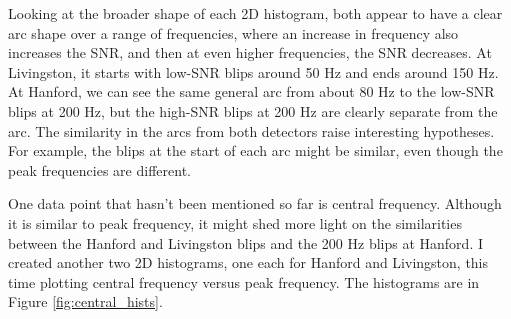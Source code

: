 \documentclass[a4paper]{article}
\begin{document}
Looking at the broader shape of each 2D histogram, both appear to have a clear arc shape over a range of frequencies, where an increase in frequency also increases the SNR, and then at even higher frequencies, the SNR decreases. At Livingston, it starts with low-SNR blips around 50 Hz and ends around 150 Hz. At Hanford, we can see the same general arc from about 80 Hz to the low-SNR blips at 200 Hz, but the high-SNR blips at 200 Hz are clearly separate from the arc. The similarity in the arcs from both detectors raise interesting hypotheses. For example, the blips at the start of each arc might be similar, even though the peak frequencies are different. 

One data point that hasn't been mentioned so far is central frequency. Although it is similar to peak frequency, it might shed more light on the similarities between the Hanford and Livingston blips and the 200 Hz blips at Hanford. I created another two 2D histograms, one each for Hanford and Livingston, this time plotting central frequency versus peak frequency. The histograms are in Figure \ref{fig:central_hists}.
\end{document}
